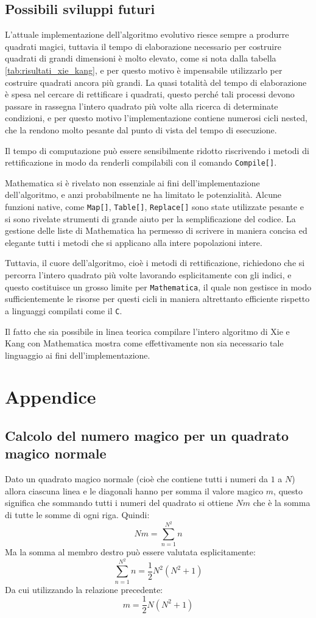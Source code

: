 \documentclass[italian,twoside,twocolumn]{article}
\begin{document}
\subsection{Possibili sviluppi futuri}
L'attuale implementazione dell'algoritmo evolutivo riesce sempre a produrre quadrati magici, tuttavia il tempo di elaborazione necessario per costruire quadrati di grandi dimensioni è molto elevato, come si nota dalla tabella \ref{tab:risultati_xie_kang}, e per questo motivo è impensabile utilizzarlo per costruire quadrati ancora più grandi. La quasi totalità del tempo di elaborazione è spesa nel cercare di rettificare i quadrati, questo perché tali processi devono passare in rassegna l'intero quadrato più volte alla ricerca di determinate condizioni, e per questo motivo l'implementazione contiene numerosi cicli nested, che la rendono molto pesante dal punto di vista del tempo di esecuzione.

Il tempo di computazione può essere sensibilmente ridotto riscrivendo i metodi di rettificazione in modo da renderli compilabili con il comando \texttt{Compile[]}.

Mathematica si è rivelato non essenziale ai fini dell'implementazione dell'algoritmo, e anzi probabilmente ne ha limitato le potenzialità. Alcune funzioni native, come \texttt{Map[]}, \texttt{Table[]}, \texttt{Replace[]} sono state utilizzate pesante e si sono rivelate strumenti di grande aiuto per la semplificazione del codice. La gestione delle liste di Mathematica ha permesso di scrivere in maniera concisa ed elegante tutti i metodi che si applicano alla intere popolazioni intere.

Tuttavia, il cuore dell'algoritmo, cioè i metodi di rettificazione, richiedono che si percorra l'intero quadrato più volte lavorando esplicitamente con gli indici, e questo costituisce un grosso limite per \texttt{Mathematica}, il quale non gestisce in modo sufficientemente le risorse per questi cicli in maniera altrettanto efficiente rispetto a linguaggi compilati come il \texttt{C}.

Il fatto che sia possibile in linea teorica compilare l'intero algoritmo di Xie e Kang con Mathematica mostra come effettivamente non sia necessario tale linguaggio ai fini dell'implementazione. 

\section{Appendice}

\subsection{Calcolo del numero magico per un quadrato magico normale}
Dato un quadrato magico normale (cioè che contiene tutti i numeri da $ 1 $ a $ N $) allora ciascuna linea e le diagonali hanno per somma il valore magico $ \mathit{m} $, questo significa che sommando tutti i numeri del quadrato si ottiene $  N \mathit{m} $ che è la somma di tutte le somme di ogni riga. Quindi:
\[  N \mathit{m} = \sum_{n = 1}^{N^2}n		\]
Ma la somma al membro destro può essere valutata esplicitamente:
\[	\sum_{n = 1}^{N^2}n = \frac{1}{2} N^2 (N^2 + 1)	\]
Da cui utilizzando la relazione precedente:
\[	 \mathit{m} = \frac{1}{2} N (N^2 + 1)	\]
\end{document}
